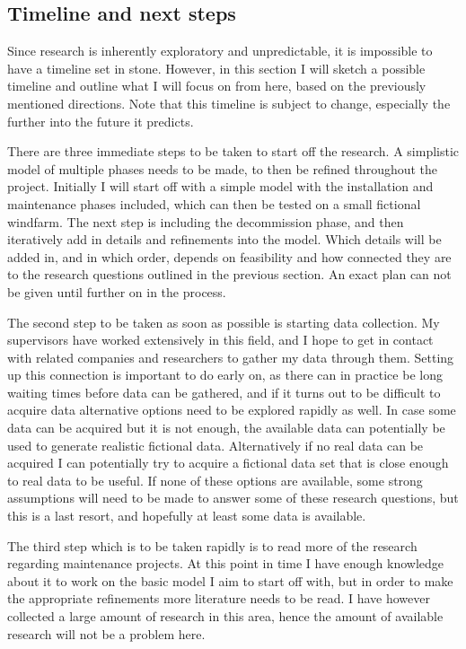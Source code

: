 \documentclass[a4paper,12pt]{article}
\begin{document}
\subsection{Timeline and next steps} \label{ss:timel}
Since research is inherently exploratory and unpredictable, it is impossible to have a timeline set in stone. However, in this section I will sketch a possible timeline and outline what I will focus on from here, based on the previously mentioned directions. Note that this timeline is subject to change, especially the further into the future it predicts. 

\bigskip

There are three immediate steps to be taken to start off the research. A simplistic model of multiple phases needs to be made, to then be refined throughout the project. Initially I will start off with a simple model with the installation and maintenance phases included, which can then be tested on a small fictional windfarm. The next step is including the decommission phase, and then iteratively add in details and refinements into the model. Which details will be added in, and in which order, depends on feasibility and how connected they are to the research questions outlined in the previous section. An exact plan can not be given until further on in the process. 

The second step to be taken as soon as possible is starting data collection. My supervisors have worked extensively in this field, and I hope to get in contact with related companies and researchers to gather my data through them. Setting up this connection is important to do early on, as there can in practice be long waiting times before data can be gathered, and if it turns out to be difficult to acquire data alternative options need to be explored rapidly as well. In case some data can be acquired but it is not enough, the available data can potentially be used to generate realistic fictional data. Alternatively if no real data can be acquired I can potentially try to acquire a fictional data set that is close enough to real data to be useful. If none of these options are available, some strong assumptions will need to be made to answer some of these research questions, but this is a last resort, and hopefully at least some data is available. 

The third step which is to be taken rapidly is to read more of the research regarding maintenance projects. At this point in time I have enough knowledge about it to work on the basic model I aim to start off with, but in order to make the appropriate refinements more literature needs to be read. I have however collected a large amount of research in this area, hence the amount of available research will not be a problem here. 
\end{document}
